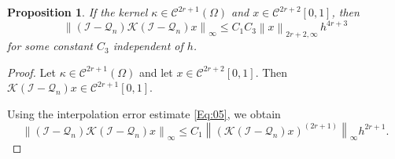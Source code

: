 \documentclass[]{interact}
\theoremstyle{plain}%
\newtheorem{proposition}[theorem]{Proposition}
\theoremstyle{definition}
\theoremstyle{remark}
\newcommand{\norm}[1]{\left\lVert #1\right\rVert}
\begin{document}
\begin{proposition} \label{Pr:02}
	If the kernel $\kappa \in \mathcal{C}^{2r+1}(\Omega)$
	and $x \in \mathcal{C}^{2r+2}[0,1]$, then
	\[
	\norm{(\mathcal{I}-\mathcal{Q}_n)\mathcal{K}(\mathcal{I}-\mathcal{Q}_n)x}_\infty
	\le C_1C_3 \norm{x}_{2r+2,\infty}\,h^{4r+3}
	\]
	for some constant $C_3$ independent of $h$.
\end{proposition}
\vspace*{-0.2in}
\begin{proof}
	Let $\kappa \in \mathcal{C}^{2r+1}(\Omega)$ and let
	$x \in \mathcal{C}^{2r+2}[0,1]$. Then
	$
	\mathcal{K}(\mathcal{I}-\mathcal{Q}_n)x \in \mathcal{C}^{2r+1}[0,1].
	$
	
	\noindent
	Using the interpolation error estimate \eqref{Eq:05}, we obtain
	\begin{equation}\label{Eq:09}
		\norm{(\mathcal{I}-\mathcal{Q}_n)\mathcal{K}(\mathcal{I}-\mathcal{Q}_n)x}_\infty
		\le C_1\norm{(\mathcal{K}(\mathcal{I}-\mathcal{Q}_n)x)^{(2r+1)}}_\infty h^{2r+1}.
	\end{equation}
	

\end{proof}
\end{document}
